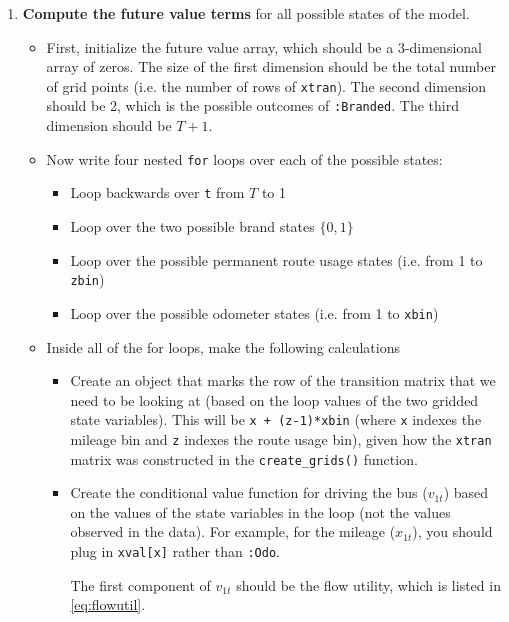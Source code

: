 \documentclass[12pt,english]{article}
\begin{document}
\begin{enumerate}
\begin{enumerate}
        \item \textbf{Compute the future value terms} for all possible states of the model. 
        \begin{itemize}
            \item First, initialize the future value array, which should be a 3-dimensional array of zeros. The size of the first dimension should be the total number of grid points (i.e. the number of rows of \texttt{xtran}). The second dimension should be 2, which is the possible outcomes of \texttt{:Branded}. The third dimension should be $T+1$.
            \item Now write four nested \texttt{for} loops over each of the possible states:
            \begin{itemize}
                \item Loop backwards over \texttt{t} from $T$ to 1
                \item Loop over the two possible brand states $\{0,1\}$
                \item Loop over the possible permanent route usage states (i.e. from 1 to \texttt{zbin})
                \item Loop over the possible odometer states (i.e. from 1 to \texttt{xbin})
            \end{itemize}
            \item Inside all of the for loops, make the following calculations
            \begin{itemize}
                \item Create an object that marks the row of the transition matrix that we need to be looking at (based on the loop values of the two gridded state variables). This will be \texttt{x + (z-1)*xbin} (where \texttt{x} indexes the mileage bin and \texttt{z} indexes the route usage bin), given how the \texttt{xtran} matrix was constructed in the \texttt{create\_grids()} function.
                \item Create the conditional value function for driving the bus ($v_{1t}$) based on the values of the state variables in the loop (not the values observed in the data). For example, for the mileage ($x_{1t}$), you should plug in \texttt{xval[x]} rather than \texttt{:Odo}.
                
                \medskip
                
                The first component of $v_{1t}$ should be the flow utility, which is listed in \eqref{eq:flowutil}.
                

\end{itemize}
\end{itemize}
\end{enumerate}
\end{enumerate}
\end{document}
